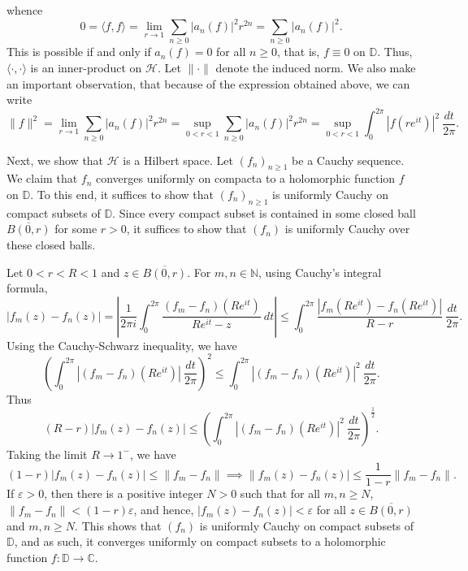 \documentclass[10pt]{amsart}
\theoremstyle{thmstyle}
\theoremstyle{defstyle}
\newcommand{\N}{\mathbb{N}}
\newcommand{\calH}{\mathcal{H}} %
\renewcommand{\le}{\leqslant}
\renewcommand{\ge}{\geqslant}
\begin{document}
whence 
\begin{equation*}
    0 = \langle f, f\rangle = \lim_{r\to 1}\sum_{n\ge 0}|a_n(f)|^2r^{2n} = \sum_{n\ge 0}|a_n(f)|^2.
\end{equation*}
This is possible if and only if $a_n(f) = 0$ for all $n\ge 0$, that is, $f\equiv 0$ on $\mathbb D$. Thus, $\langle\cdot,\cdot\rangle$ is an inner-product on $\calH$. Let $\|\cdot\|$ denote the induced norm. We also make an important observation, that because of the expression obtained above, we can write 
\begin{equation}
    \|f\|^2 = \lim_{r\to 1}\sum_{n\ge 0}|a_n(f)|^2r^{2n} = \sup_{0 < r < 1}\sum_{n\ge 0} |a_n(f)|^2r^{2n} = \sup_{0 < r < 1}\int_{0}^{2\pi}|f(re^{it})|^2~\frac{dt}{2\pi}.\tag{$\dagger$}\label{alternate-definition}
\end{equation}

Next, we show that $\calH$ is a Hilbert space. Let $(f_n)_{n\ge 1}$ be a Cauchy sequence. We claim that $f_n$ converges uniformly on compacta to a holomorphic function $f$ on $\mathbb D$. To this end, it suffices to show that $(f_n)_{n\ge 1}$ is uniformly Cauchy on compact subsets of $\mathbb D$. Since every compact subset is contained in some closed ball $\overline{B(0, r)}$ for some $r > 0$, it suffices to show that $(f_n)$ is uniformly Cauchy over these closed balls. 

Let $0 < r < R < 1$ and $z\in\overline{B(0, r)}$. For $m,n\in\N$, using Cauchy's integral formula, 
\begin{equation*}
    |f_m(z) - f_n(z)| = \left|\frac{1}{2\pi i}\int_0^{2\pi}\frac{(f_m - f_n)(Re^{it})}{Re^{it} - z}~dt\right|\le\int_0^{2\pi}\frac{|f_m(Re^{it}) - f_n(Re^{it})|}{R - r}~\frac{dt}{2\pi}.
\end{equation*}
Using the Cauchy-Schwarz inequality, we have 
\begin{equation*}
    \left(\int_0^{2\pi}|(f_m - f_n)(Re^{it})|~\frac{dt}{2\pi}\right)^{2}\le\int_0^{2\pi}|(f_m - f_n)(Re^{it})|^2~\frac{dt}{2\pi}.
\end{equation*}
Thus 
\begin{equation*}
    (R - r)|f_m(z) - f_n(z)|\le\left(\int_0^{2\pi}|(f_m - f_n)(Re^{it})|^2~\frac{dt}{2\pi}\right)^{\frac{1}{2}}.
\end{equation*}
Taking the limit $R\to 1^-$, we have 
\begin{equation*}
    (1 - r)|f_m(z) - f_n(z)|\le\|f_m - f_n\|\implies\|f_m(z) - f_n(z)|\le\frac{1}{1 - r}\|f_m - f_n\|.
\end{equation*}
If $\varepsilon > 0$, then there is a positive integer $N > 0$ such that for all $m,n\ge N$, $\|f_m - f_n\| < (1 - r)\varepsilon$, and hence, $|f_m(z) - f_n(z)| < \varepsilon$ for all $z\in\overline{B(0, r)}$ and $m,n\ge N$. This shows that $(f_n)$ is uniformly Cauchy on compact subsets of $\mathbb D$, and as such, it converges uniformly on compact subsets to a holomorphic function $f:\mathbb D\to\mathbb C$.
\end{document}
